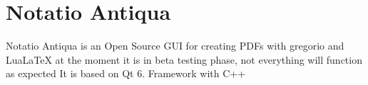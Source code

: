 \chapter{Notatio Antiqua}
\hypertarget{index}{}\label{index}
Notatio Antiqua is an Open Source GUI for creating PDFs with gregorio and Lua\+La\+TeX at the moment it is in beta testing phase, not everything will function as expected It is based on Qt 6. Framework with C++ 